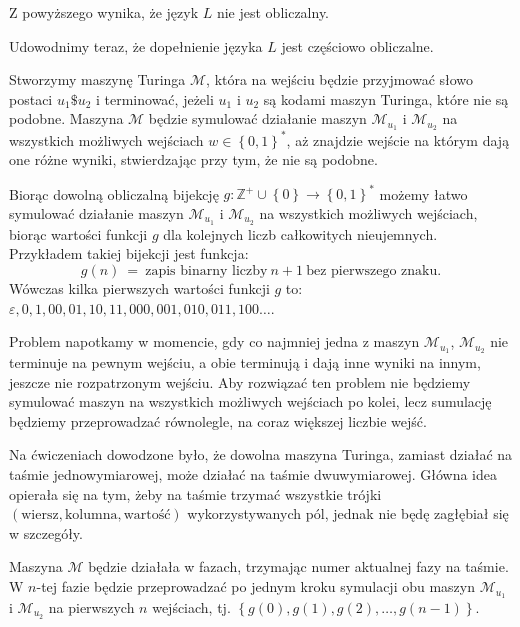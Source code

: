 \documentclass[12pt]{article}
\begin{document}
	\medskip
	
	Z powyższego wynika, że język \(L\) nie jest obliczalny.
	
	\bigskip
	
	Udowodnimy teraz, że dopełnienie języka \(L\) jest częściowo obliczalne.
	
	\medskip
	
	Stworzymy maszynę Turinga \(\mathcal{M}\), która na wejściu będzie
	przyjmować słowo postaci \(u_{1} \$ u_{2}\) i terminować, jeżeli \(u_{1}\) i
	\(u_{2}\) są kodami maszyn Turinga, które nie są podobne. Maszyna
	\(\mathcal{M}\) będzie symulować działanie maszyn \(\mathcal{M}_{u_{1}}\) i
	\(\mathcal{M}_{u_{2}}\) na wszystkich możliwych wejściach \(w \in \left\{ 0,
	1 \right\} ^ {\ast}\), aż znajdzie wejście na którym dają one różne wyniki,
	stwierdzając przy tym, że nie są podobne.
	
	\medskip
	
	Biorąc dowolną obliczalną bijekcję \(g : \mathbb{Z}^{+} \cup \left\{ 0
	\right\} \rightarrow \left\{ 0, 1 \right\} ^ {\ast}\) możemy łatwo symulować
	działanie maszyn \(\mathcal{M}_{u_{1}}\) i \(\mathcal{M}_{u_{2}}\) na
	wszystkich możliwych wejściach, biorąc wartości funkcji \(g\) dla kolejnych
	liczb całkowitych nieujemnych. Przykładem takiej bijekcji jest funkcja:
	\[ g \left( n \right) \ = \ \text{zapis binarny liczby} \ n + 1 \ \text{bez
	pierwszego znaku.} \]
	Wówczas kilka pierwszych wartości funkcji \(g\) to: \(\varepsilon, 0, 1, 00,
	01, 10, 11, 000, 001, 010, 011, 100 \ldots\).
	
	\medskip
	
	Problem napotkamy w momencie, gdy co najmniej jedna z maszyn
	\(\mathcal{M}_{u_{1}}\), \(\mathcal{M}_{u_{2}}\) nie terminuje na pewnym
	wejściu, a obie terminują i dają inne wyniki na innym, jeszcze nie
	rozpatrzonym wejściu. Aby rozwiązać ten problem nie będziemy symulować
	maszyn na wszystkich możliwych wejściach po kolei, lecz sumulację będziemy
	przeprowadzać równolegle, na coraz większej liczbie wejść.
	
	\medskip
	
	Na ćwiczeniach dowodzone było, że dowolna maszyna Turinga, zamiast działać
	na taśmie jednowymiarowej, może działać na taśmie dwuwymiarowej. Główna idea
	opierała się na tym, żeby na taśmie trzymać wszystkie trójki \(\left(
	\text{wiersz}, \text{kolumna}, \text{wartość} \right)\) wykorzystywanych
	pól, jednak nie będę zagłębiał się w szczegóły.
	
	\medskip
	
	Maszyna \(\mathcal{M}\) będzie działała w fazach, trzymając numer aktualnej
	fazy na taśmie. W \(n\)-tej fazie będzie przeprowadzać po jednym kroku
	symulacji obu maszyn \(\mathcal{M}_{u_{1}}\) i \(\mathcal{M}_{u_{2}}\)
	na pierwszych \(n\) wejściach, tj. \(\left\{ g \left( 0 \right), g \left( 1
	\right), g \left( 2 \right), \ldots, g \left( n - 1 \right) \right\}\).
	
\end{document}
